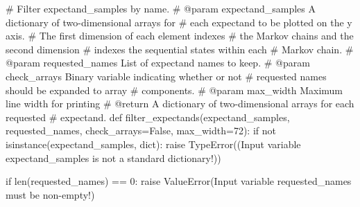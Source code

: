 \documentclass[
  letterpaper,
  DIV=11,
  numbers=noendperiod]{scrartcl}
\newenvironment{Shaded}{\begin{snugshade}}{\end{snugshade}}
\newcommand{\BuiltInTok}[1]{\textcolor[rgb]{0.00,0.23,0.31}{#1}}
\newcommand{\CommentTok}[1]{\textcolor[rgb]{0.37,0.37,0.37}{#1}}
\newcommand{\ControlFlowTok}[1]{\textcolor[rgb]{0.00,0.23,0.31}{#1}}
\newcommand{\DecValTok}[1]{\textcolor[rgb]{0.68,0.00,0.00}{#1}}
\newcommand{\KeywordTok}[1]{\textcolor[rgb]{0.00,0.23,0.31}{#1}}
\newcommand{\NormalTok}[1]{\textcolor[rgb]{0.00,0.23,0.31}{#1}}
\newcommand{\OperatorTok}[1]{\textcolor[rgb]{0.37,0.37,0.37}{#1}}
\newcommand{\PreprocessorTok}[1]{\textcolor[rgb]{0.68,0.00,0.00}{#1}}
\newcommand{\StringTok}[1]{\textcolor[rgb]{0.13,0.47,0.30}{#1}}
\newcommand{\VariableTok}[1]{\textcolor[rgb]{0.07,0.07,0.07}{#1}}
\begin{document}
\begin{Shaded}
\begin{Highlighting}[]
\CommentTok{\# Filter \textasciigrave{}expectand\_samples\textasciigrave{} by name.}
\CommentTok{\# @param expectand\_samples A dictionary of two{-}dimensional arrays for}
\CommentTok{\#                          each expectand to be plotted on the y axis.}
\CommentTok{\#                          The first dimension of each element indexes}
\CommentTok{\#                          the Markov chains and the second dimension}
\CommentTok{\#                          indexes the sequential states within each}
\CommentTok{\#                          Markov chain.}
\CommentTok{\# @param requested\_names List of expectand names to keep.}
\CommentTok{\# @param check\_arrays Binary variable indicating whether or not}
\CommentTok{\#                     requested names should be expanded to array}
\CommentTok{\#                     components.}
\CommentTok{\# @param max\_width Maximum line width for printing}
\CommentTok{\# @return A dictionary of two{-}dimensional arrays for each requested}
\CommentTok{\#         expectand.}
\KeywordTok{def}\NormalTok{ filter\_expectands(expectand\_samples, requested\_names,}
\NormalTok{                      check\_arrays}\OperatorTok{=}\VariableTok{False}\NormalTok{, max\_width}\OperatorTok{=}\DecValTok{72}\NormalTok{):}
  \ControlFlowTok{if} \KeywordTok{not} \BuiltInTok{isinstance}\NormalTok{(expectand\_samples, }\BuiltInTok{dict}\NormalTok{):}
    \ControlFlowTok{raise} \PreprocessorTok{TypeError}\NormalTok{((}\StringTok{\textquotesingle{}Input variable \textasciigrave{}expectand\_samples\textasciigrave{} \textquotesingle{}}
           \StringTok{\textquotesingle{}is not a standard dictionary!\textquotesingle{}}\NormalTok{))}
  
  \ControlFlowTok{if} \BuiltInTok{len}\NormalTok{(requested\_names) }\OperatorTok{==} \DecValTok{0}\NormalTok{:}
    \ControlFlowTok{raise} \PreprocessorTok{ValueError}\NormalTok{(}\StringTok{\textquotesingle{}Input variable \textasciigrave{}requested\_names\textasciigrave{} must be non{-}empty!\textquotesingle{}}\NormalTok{)}
  

\end{Highlighting}
\end{Shaded}
\end{document}
